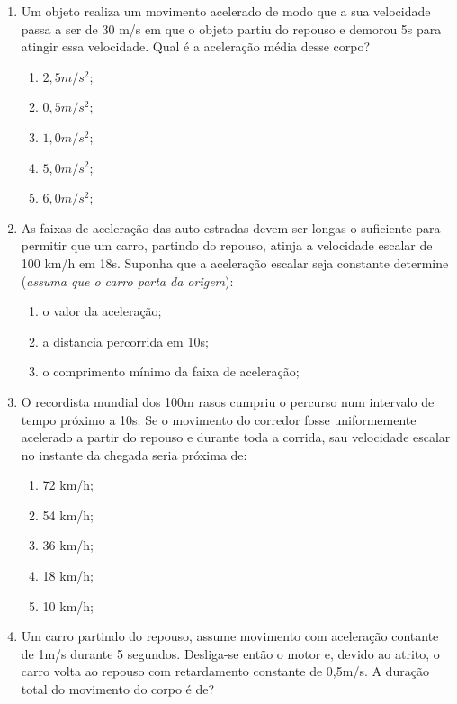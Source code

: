 \documentclass[12pt]{extarticle}
\newcommand{\<}{\langle}
\renewcommand{\>}{\rangle}
\theoremstyle{definition}
\begin{document}
        \begin{enumerate}
            \item Um objeto realiza um movimento acelerado de modo que a sua velocidade passa a ser de 30 m/s em que o objeto partiu do repouso e demorou 5s para atingir essa velocidade. Qual é a aceleração média desse corpo?
            \begin{enumerate}
                \item $2,5 m/s^2$;
                \item $0,5 m/s^2$;
                \item $1,0 m/s^2$;
                \item $5,0 m/s^2$;
                \item $6,0 m/s^2$;
            \end{enumerate}
            
            \item As faixas de aceleração das auto-estradas devem ser longas o suficiente para permitir que um carro, partindo do repouso, atinja a velocidade escalar de 100 km/h em 18s. Suponha que a aceleração escalar seja constante determine (\textit{assuma que o carro parta da origem}):
            \begin{enumerate}
                \item o valor da aceleração;
                \item a distancia percorrida em 10s;
                \item o comprimento mínimo da faixa de aceleração;
            \end{enumerate}
            
            \item  O recordista mundial dos 100m rasos cumpriu o percurso num intervalo de tempo próximo a 10s. Se o movimento do corredor fosse uniformemente acelerado a partir do repouso e durante toda a corrida, sau velocidade escalar no instante da chegada seria próxima de:
            \begin{enumerate}
                \item 72 km/h;
                \item 54 km/h;
                \item 36 km/h;
                \item 18 km/h;
                \item 10 km/h;
            \end{enumerate}
            
            \item Um carro partindo do repouso, assume movimento com aceleração contante de 1m/s durante 5 segundos. Desliga-se então o motor e, devido ao atrito, o carro volta ao repouso com retardamento constante de 0,5m/s. A duração total do movimento do corpo é de?
            

\end{enumerate}
\end{document}
